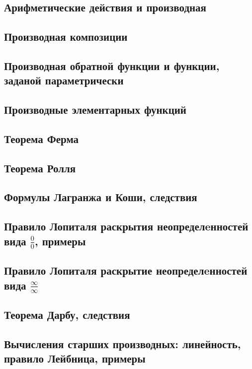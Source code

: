 \subsection{Арифметические действия и производная}

\skip
\subsection{Производная композиции}

\skip
\subsection{Производная обратной функции и функции, заданой параметрически}

\skip
\subsection{Производные элементарных функций}

\skip
\subsection{Теорема Ферма}

\skip
\subsection{Теорема Ролля}

\skip
\subsection{Формулы Лагранжа и Коши, следствия}

\skip
\subsection{Правило Лопиталя раскрытия неопределeнностей вида $\frac{0}{0}$, примеры}

\skip
\subsection{Правило Лопиталя раскрытие неопределeнностей вида $\frac{\infty}{\infty}$}

\skip
\subsection{Теорема Дарбу, следствия}

\skip
\subsection{Вычисления старших производных: линейность, правило Лейбница, примеры}

\skip
